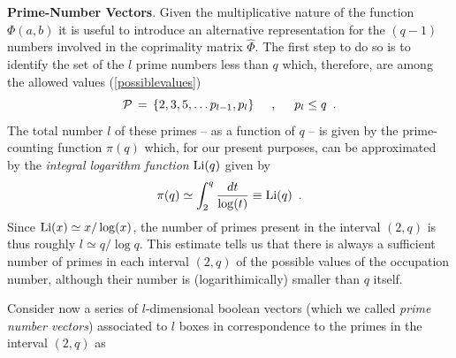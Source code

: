\documentclass[aps,pra,superscriptaddress]{revtex4}
\newcommand\be            {\begin{equation}}
\newcommand\ee            {\end{equation}}
\renewcommand{\(}{\left(}
\renewcommand{\)}{\right)}
\renewcommand{\[}{\left[}
\renewcommand{\]}{\right]}
\begin{document}
\vspace{3mm}
\noindent
{\bf Prime-Number Vectors}. Given the multiplicative nature of the function $\Phi(a,b)$ it is useful to introduce an alternative representation 
for the $(q-1)$ numbers involved in the coprimality matrix $\widehat\Phi$. The first step to do so is to identify the set of the $l$ prime numbers less than $q$ which, therefore, are among the allowed values (\ref{possiblevalues})
\be
{\mathcal P} \,=\,\{2,3,5,\ldots p_{l-1}, p_l\}  
\hspace{5mm}
,
\hspace{5mm} p_l \leq q \,\,\,. 
\ee
The total number $l$ of these primes -- as a function of $q$ -- is given by the prime-counting function $\pi(q)$ which, for our present purposes, 
can be approximated by the {\em integral logarithm function} ${\rm Li}(q)$ given by 
\be
\pi(q) \simeq \int_2^q \frac{dt}{\log(t)} \equiv {\rm Li}(q)\,\,\,.
\label{countingprime}
\ee
Since ${\rm Li}(x) \simeq x/\log(x)$, the number of primes present in the interval $(2,q)$ is thus roughly $l \simeq q/\log q$.  
This estimate tells us that there is always a sufficient number of primes in each interval $(2,q)$ of the possible values of the occupation number, although their number is (logarithimically) smaller than $q$ itself. 

Consider now a series of $l$-dimensional boolean vectors (which we called {\em prime number vectors}) associated to $l$ boxes in 
correspondence to the primes in the interval $(2,q)$ as 
\begin{figure}[h!]
\begin{center}
\label{boxes}
\end{center}
\end{figure}
\end{document}
